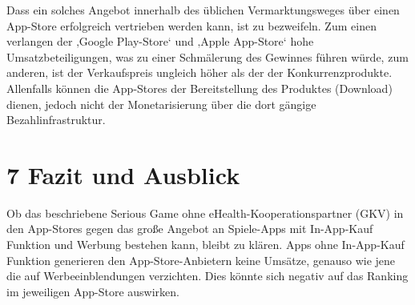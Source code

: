 \documentclass[
  a4paper,
  DIV=11,
  numbers=noendperiod,
  onecolumn,
  oneside,
  a4paper]{scrartcl}
\begin{document}
Dass ein solches Angebot innerhalb des üblichen Vermarktungsweges über
einen App-Store erfolgreich vertrieben werden kann, ist zu bezweifeln.
Zum einen verlangen der ‚Google Play-Store` und ‚Apple App-Store` hohe
Umsatzbeteiligungen, was zu einer Schmälerung des Gewinnes führen würde,
zum anderen, ist der Verkaufspreis ungleich höher als der der
Konkurrenzprodukte. Allenfalls können die App-Stores der Bereitstellung
des Produktes (Download) dienen, jedoch nicht der Monetarisierung über
die dort gängige Bezahlinfrastruktur.

\section{7 Fazit und Ausblick}\label{fazit-und-ausblick}

Ob das beschriebene Serious Game ohne eHealth-Kooperationspartner (GKV)
in den App-Stores gegen das große Angebot an Spiele-Apps mit In-App-Kauf
Funktion und Werbung bestehen kann, bleibt zu klären. Apps ohne
In-App-Kauf Funktion generieren den App-Store-Anbietern keine Umsätze,
genauso wie jene die auf Werbeeinblendungen verzichten. Dies könnte sich
negativ auf das Ranking im jeweiligen App-Store auswirken.
\end{document}
